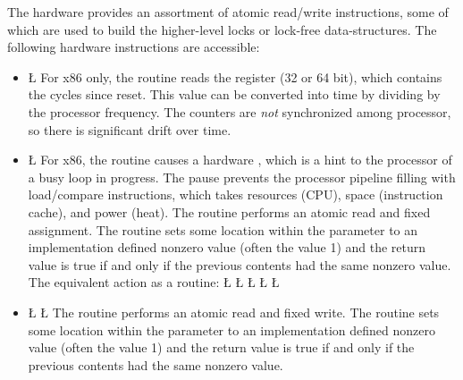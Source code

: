 \documentclass[openright,twoside]{report}
\begin{document}
The hardware provides an assortment of atomic read/write instructions, some of which are used to build the higher-level locks or lock-free data-structures.
The following hardware instructions are accessible:
\begin{itemize}
\item
{\LGindent=0pt
\LGinlinefalse\LGbegin\lgrinde
\L{}
\CE{}\endlgrinde\LGend
}%
For x86 only, the routine reads the  register (32 or 64 bit), which contains the cycles since reset.
This value can be converted into time by dividing by the processor frequency.
The counters are \emph{not} synchronized among processor, so there is significant drift over time.
\item
{\LGindent=0pt
\LGinlinefalse\LGbegin\lgrinde
\L{}
\endlgrinde\LGend
}%
For x86, the routine causes a hardware , which is a hint to the processor of a busy loop in progress.
The pause prevents the processor pipeline filling with load/compare instructions, which takes resources (CPU), space (instruction cache), and power (heat).
The  routine performs an atomic read and fixed assignment.
The routine sets some location within the parameter to an implementation defined nonzero value (often the value 1) and the return value is true if and only if the previous contents had the same nonzero value.
The equivalent action as a \Index[C++]{\CC} routine:
\LGinlinefalse\LGbegin\lgrinde
\L{}
\CE{}\L{\LB{}}
\CE{}\L{\LB{}}
\CE{}\L{\LB{}}
\CE{}\L{\LB{\}}}
\endlgrinde\LGend
\item
{\LGindent=0pt
\LGinlinefalse\LGbegin\lgrinde
\L{}
\L{}
\endlgrinde\LGend
}%
The  routine performs an atomic read and fixed write.
The routine sets some location within the parameter to an implementation defined nonzero value (often the value 1) and the return value is true if and only if the previous contents had the same nonzero value.

\end{itemize}
\end{document}
